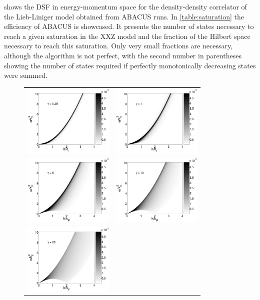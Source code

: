 \documentclass[11pt, a4paper]{report} %
\begin{document}
 shows the DSF in energy-momentum space for the density-density correlator of the Lieb-Liniger model obtained from ABACUS runs.
In \cref{table:saturation} the efficiency of ABACUS is showcased.
It presents the number of states necessary to reach a given saturation in the XXZ model and the fraction of the Hilbert space necessary to reach this saturation.
Only very small fractions are necessary, although the algorithm is not perfect, with the second number in parentheses showing the number of states required if perfectly monotonically decreasing states were summed.

\begin{figure}[tb!]
  \centering
  \begin{tabular}{cc}
    \includegraphics[width=4.3cm]{c_0p25_L_100_N_100.eps}
    &
      \includegraphics[width=4.3cm]{c_1_L_100_N_100.eps} \\
    \includegraphics[width=4.3cm]{c_5_L_100_N_100.eps}
    &
      \includegraphics[width=4.3cm]{c_10_L_100_N_100.eps} \\
    \includegraphics[width=4.3cm]{c_20_L_100_N_100.eps}

\end{tabular}
\end{figure}
\end{document}
